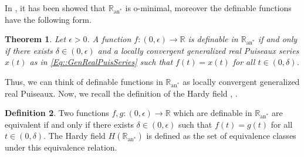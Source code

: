 \documentclass{article}
\newtheorem{theorem}{Theorem}[section]
\theoremstyle{definition}
\newtheorem{definition}[theorem]{Definition}
\begin{document}
In  \cite[Theorem A]{Dries::GenPowerSeries}, it has been showed that $\mathbb{R}_{\text{an}^*}$ is o-minimal, moreover the definable functions have the following form. 

\begin{theorem}
    \cite[Theorem B]{Dries::GenPowerSeries} Let $\epsilon >0$. A function $f\colon (0,\epsilon) \to \mathbb{R}$ is definable in $\mathbb{R}_{\text{an}^*}$ if and only if there exists $\delta \in (0,\epsilon)$ and a locally convergent generalized real Puiseaux series $x(t)$ as in \eqref{Eq::GenRealPuisSeries} such that $f(t) = x(t)$ for all $t \in (0,\delta)$.
\end{theorem}

Thus, we can think of definable functions in $\mathbb{R}_{\text{an}^*}$ as locally convergent generalized real Puiseaux. Now, we recall the definition of the Hardy field \cite[Section 4.1]{Alessandrini::LogLimit}, \cite[Section 5.3]{Coste::oMinimal}.

\begin{definition}
\label{Def:HardyField}
    Two functions $f,g\colon (0,\epsilon) \to \mathbb{R}$ which are definable in $\mathbb{R}_{\text{an}^*}$ are equivalent if and only if there exists $\delta \in (0,\epsilon)$ such that $f(t) = g(t)$ for all $t \in (0,\delta)$. The Hardy field $H( \mathbb{R}_{\text{an}^*})$ is defined as the set of equivalence classes under this equivalence relation.
\end{definition}
\end{document}
